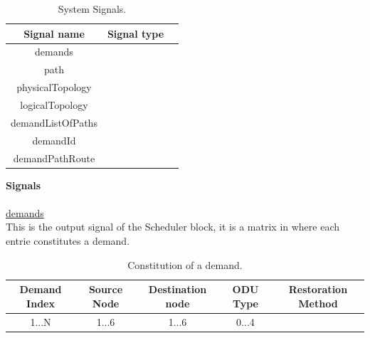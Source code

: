 

\begin{table}[H]
	\centering
	\begin{tabular}{| c | c | c |}
		\hline
		Signal name & Signal type \\ %
		\hline
		demands &  \\ \hline
		path &  \\ \hline
		physicalTopology & \\ \hline
		logicalTopology &  \\ \hline
		demandListOfPaths &   \\ \hline
		demandId &   \\ \hline
		demandPathRoute & \\ \hline
	\end{tabular}
	\caption{System Signals.}
	\label{system_signals}
\end{table}
\textbf{Signals} 
\\
\\
\underline{demands}
\\ 
This is the output signal of the Scheduler block, it is a matrix in where each entrie constitutes a demand.\\
\begin{table}[H]
	\begin{tabular}{|c|c|c|c|c|}
		\hline
		Demand Index & Source Node & Destination node & ODU Type & Restoration Method \\ \hline
		1...N        & 1...6       & 1...6            & 0...4    &                    \\ \hline
	\end{tabular}
		\caption{Constitution of a demand.}
	\label{demand_variable}
\end{table}

